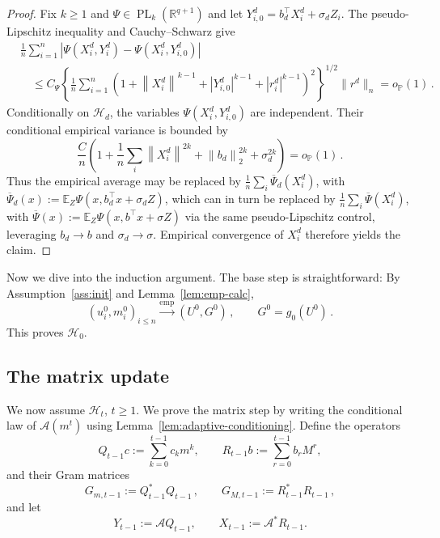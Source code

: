 \documentclass[11pt]{article}
\theoremstyle{definition}
\theoremstyle{remark}
\numberwithin{equation}{section}
\numberwithin{theorem}{section}
\newcommand{\R}{\mathbb R}
\newcommand{\E}{\mathbb E}
\newcommand{\Prob}{\mathbb P}
\newcommand{\norm}[1]{\left\lVert #1\right\rVert}
\newcommand{\abs}[1]{\left\lvert #1\right\rvert}
\newcommand{\cA}{\mathcal A}
\newcommand{\PL}{\operatorname{PL}}
\begin{document}
\begin{proof}
Fix $k\ge1$ and $\Psi\in\PL_k(\R^{q+1})$ and let
$Y_{i,0}^d=b_d^\top X_i^d+\sigma_dZ_i$.  The pseudo-Lipschitz inequality
and Cauchy--Schwarz give
\[
\begin{aligned}
 &\frac1n\sum_{i=1}^n
 \abs{\Psi(X_i^d,Y_i^d)-\Psi(X_i^d,Y_{i,0}^d)}\\
 &\quad\le C_\Psi
 \left\{\frac1n\sum_{i=1}^n
 \left(1+\norm{X_i^d}^{k-1}+\abs{Y_{i,0}^d}^{k-1}
       +\abs{r_i^d}^{k-1}\right)^2\right\}^{1/2}
 \big\|r^d\big\|_n=o_{\Prob}(1)\,.
\end{aligned}
\]
Conditionally on $\mathscr H_d$, the variables
$\Psi(X_i^d,Y_{i,0}^d)$ are independent.  Their conditional empirical
variance is bounded by
\[
  \frac{C}{n}\left(1+\frac1n\sum_i\norm{X_i^d}^{2k}
      +\norm{b_d}_2^{2k}+\sigma_d^{2k}\right)=o_{\Prob}(1)\,.
\]
Thus the empirical average may be replaced by
$\frac1n\sum_i\overline\Psi_d(X_i^d)$, with 
$\overline\Psi_d(x) :=\E_Z\Psi(x,b_d^\top x+\sigma_dZ)$, 
which can in turn be replaced by 
$\frac1n\sum_i\overline\Psi(X_i^d)$, with $\overline\Psi(x) :=\E_Z\Psi(x,b^\top x+\sigma Z)$ 
via the same pseudo-Lipschitz control, leveraging $b_d \to b$ and $\sigma_d \to \sigma$. Empirical convergence of $X_i^d$ therefore yields the claim.
\end{proof}


Now we dive into the induction argument. 
%
The base step is straightforward:
By Assumption~\ref{ass:init} and Lemma~\ref{lem:emp-calc},
\[
 (u_i^0,m_i^0)_{i\le n}
 \xrightarrow{\mathrm{emp}}(U^0,G^0)\,,
 \qquad G^0=g_0(U^0)\,.
\]
This proves $\mathcal H_0$. 
%
%


\subsection{The matrix update}
\label{sec:matrix-update}
We now assume $\mathcal{H}_{t}$, $t\ge 1$. 
%
We prove the matrix step by writing the conditional law of $\cA(m^t)$ using Lemma~\ref{lem:adaptive-conditioning}. 
Define the operators
\[
  Q_{t-1}c:=\sum_{k=0}^{t-1}c_km^k,
  \qquad
  R_{t-1}b:=\sum_{r=0}^{t-1}b_rM^r,
\]
and their Gram matrices
\[
  G_{m,t-1}:=Q_{t-1}^*Q_{t-1}\,,
  \qquad
  G_{M,t-1}:=R_{t-1}^*R_{t-1}\,,
\]
and let
\begin{equation}
      Y_{t-1}:=\cA Q_{t-1},
  \qquad
  X_{t-1}:=\cA^* R_{t-1}.
\end{equation}
%
\end{document}

